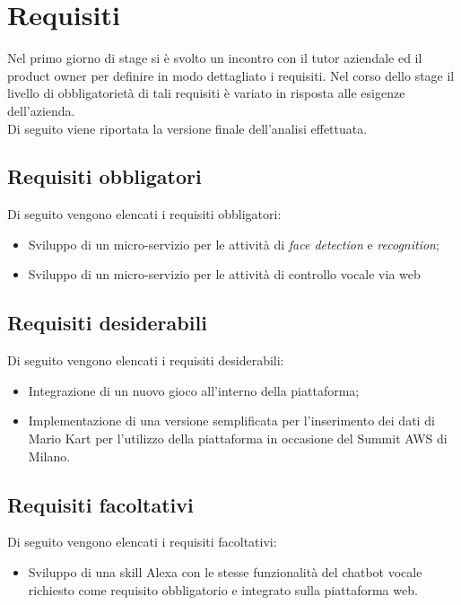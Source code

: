 \section{Requisiti}
Nel primo giorno di stage si è svolto un incontro con il tutor aziendale ed il product owner per definire in modo dettagliato i requisiti. Nel corso dello stage il livello di obbligatorietà di tali requisiti è variato in risposta alle esigenze dell'azienda. \\
 Di seguito viene riportata la versione finale dell'analisi effettuata.

	\subsection{Requisiti obbligatori}
		Di seguito vengono elencati i requisiti obbligatori:
		\begin{itemize}
			\item Sviluppo di un micro-servizio per le attività di \emph{face detection} e \emph{recognition};
			\item Sviluppo di un micro-servizio per le attività di controllo vocale via web
		\end{itemize}
	\subsection{Requisiti desiderabili}
		Di seguito vengono elencati i requisiti desiderabili:
		\begin{itemize}
			\item Integrazione di un nuovo gioco all'interno della piattaforma;
			\item Implementazione di una versione semplificata per l'inserimento dei dati di Mario Kart per l'utilizzo
			della piattaforma in occasione del Summit \gls{AWS} di Milano.
		\end{itemize}
	\subsection{Requisiti facoltativi}
		Di seguito vengono elencati i requisiti facoltativi:
		\begin{itemize}
			\item Sviluppo di una \gls{skill} Alexa con le stesse funzionalità del \gls{chatbot} vocale richiesto come requisito obbligatorio e integrato sulla piattaforma web.
		\end{itemize}

